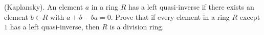 

	
\renewcommand{\footrulewidth}{0.4pt}






(Kaplansky). An element $a$ in a ring $R$ has a left quasi-inverse if there exists an element $b \in R$ with $a+b-ba= 0$.
Prove that if every element in a ring $R$ except $1$ has a left quasi-inverse, then $R$ is a division ring.
